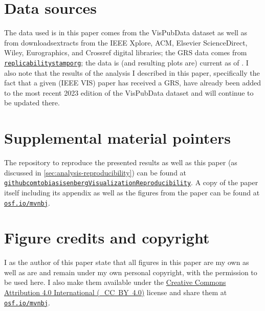 \documentclass[conference,svgnames]{vgtc}                     %
\newcommand{\osfid}{mvnbj}
\begin{document}
\section*{Data sources}
\label{sec:data_sources}

The data used is in this paper comes from the VisPubData dataset \cite{Isenberg:2017:VMC} as well as from down\-loads\discretionary{/}{}{/}ex\-tracts from the IEEE Xplore, ACM, Elsevier ScienceDirect, Wiley, Eurographics, and Crossref digital libraries; the GRS data comes from \href{https://www.replicabilitystamp.org/}{\texttt{replicabilitystamporg}}; the data is (and resulting plots are) current as of \GrsiDataCurrentAsOf{}. I also note that the results of the analysis I described in this paper, specifically the fact that a given (IEEE VIS) paper has received a GRS, have already been added to the most recent 2023 edition of the VisPubData dataset \cite{Isenberg:2017:VMC} and will continue to be updated there.

\section*{Supplemental material pointers}
\label{sec:supplemental_materials}

The repository to reproduce the presented results as well as this paper (as discussed in \autoref{sec:analysis-reproducibility}) can be found at \href{https://github.com/tobiasisenberg/Visualization-Reproducibility}{\texttt{githubcom\discretionary{/}{}{/}tobiasisenberg\discretionary{/}{}{/}Visualization\discretionary{}{-}{-}Reproducibility}}. A copy of the paper itself including its appendix as well as the figures from the paper can be found at \href{https://osf.io/\osfid/}{\texttt{osf.io/\osfid}}.

\section*{Figure credits and copyright}
\label{sec:figure_credits}

I as the author of this paper state that all figures in this paper are my own as well as are and remain under my own personal copyright, with the permission to be used here. I also make them available under the \href{https://creativecommons.org/licenses/by/4.0/}{Creative Commons At\-tri\-bu\-tion 4.0 International (\ccLogo\,\ccAttribution\ \mbox{CC BY 4.0})} license and share them at \href{https://osf.io/\osfid/}{\texttt{osf.io/\osfid}}.
\end{document}
